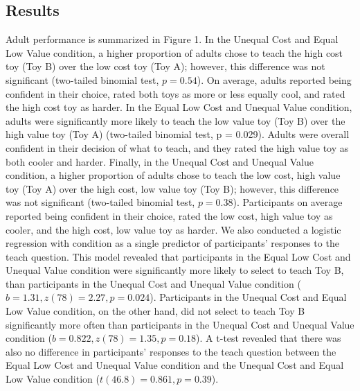 \documentclass[10pt,letterpaper]{article}
\begin{document}
\subsection{Results}

Adult performance is summarized in Figure 1. In the Unequal Cost and Equal Low Value condition, a higher proportion of adults chose to teach the high cost toy (Toy B) over the low cost toy (Toy A); however, this difference was not significant (two-tailed binomial test, $p = 0.54$). 
On average, adults reported being confident in their choice, rated both toys as more or less equally cool, and rated the high cost toy as harder.
In the Equal Low Cost and Unequal Value condition, adults were significantly more likely to teach the low value toy (Toy B) over the high value toy (Toy A) (two-tailed binomial test, p = 0.029). 
Adults were overall confident in their decision of what to teach, and they rated the high value toy as both cooler and harder.
Finally, in the Unequal Cost and Unequal Value condition, a higher proportion of adults chose to teach the low cost, high value toy (Toy A) over the high cost, low value toy (Toy B); however, this difference was not significant (two-tailed binomial test, $p = 0.38$). 
Participants on average reported being confident in their choice, rated the low cost, high value toy as cooler, and the high cost, low value toy as harder.
We also conducted a logistic regression with condition as a single predictor of participants' responses to the teach question. This model revealed that participants in the Equal Low Cost and Unequal Value condition were significantly more likely to select to teach Toy B, than participants in the Unequal Cost and Unequal Value condition ($b = 1.31, z(78) = 2.27, p = 0.024$). Participants in the Unequal Cost and Equal Low Value condition, on the other hand, did not select to teach Toy B significantly more often than participants in the Unequal Cost and Unequal Value condition ($b = 0.822, z(78) = 1.35, p = 0.18$). A t-test revealed that there was also no difference in participants' responses to the teach question between the Equal Low Cost and Unequal Value condition and the Unequal Cost and Equal Low Value condition ($t(46.8) = 0.861,  p = 0.39$). 
\end{document}
